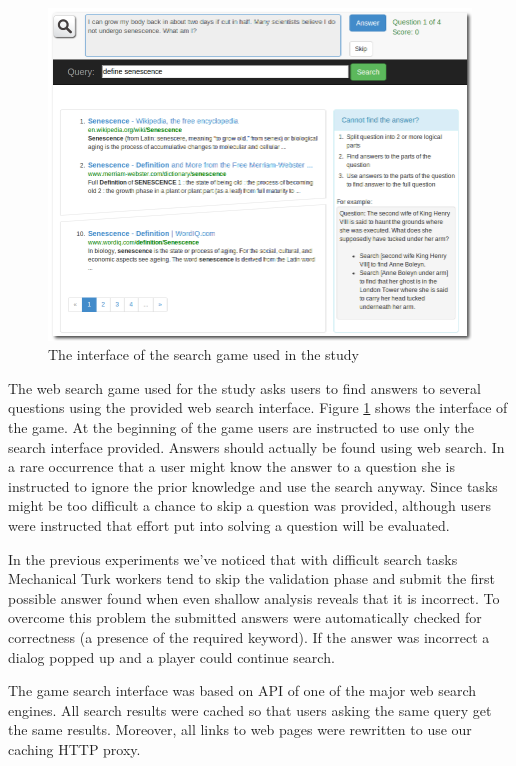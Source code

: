 \documentclass{sig-alternate}
\begin{document}
\begin{figure}
\centering
\includegraphics[scale=0.29]{img/ufindit}
\caption{The interface of the search game used in the study}
\label{figure:ufindit}
\end{figure}


The web search game used for the study asks users to find answers to several questions using the provided web search interface. Figure \ref{figure:ufindit} shows the interface of the game. 
At the beginning of the game users are instructed to use only the search interface provided.
Answers should actually be found using web search.
In a rare occurrence that a user might know the answer to a question she is instructed to ignore the prior knowledge and use the search anyway.
Since tasks might be too difficult a chance to skip a question was provided, although users were instructed that effort put into solving a question will be evaluated.

In the previous experiments we've noticed that with difficult search tasks Mechanical Turk workers tend to skip the validation phase \cite{Ageev:2011:FYG:2009916.2009965} and submit the first possible answer found when even shallow analysis reveals that it is incorrect.
To overcome this problem the submitted answers were automatically checked for correctness (a presence of the required keyword).
If the answer was incorrect a dialog popped up and a player could continue search.

The game search interface was based on API of one of the major web search engines. All search results were cached so that users asking the same query get the same results. Moreover, all links to web pages were rewritten to use our caching HTTP proxy.
\end{document}
